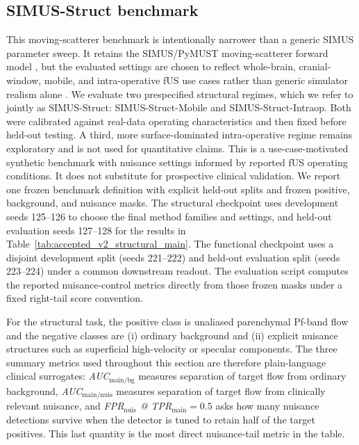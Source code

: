 \documentclass[11pt]{article}
\begin{document}
\subsection{SIMUS-Struct benchmark}
\label{sec:accepted-v2-main}
This moving-scatterer benchmark is intentionally narrower than a generic SIMUS parameter sweep. It retains the SIMUS/PyMUST moving-scatterer forward model \cite{GarciaSIMUSPartI2022,CigierSIMUSPartII2022}, but the evaluated settings are chosen to reflect whole-brain, cranial-window, mobile, and intra-operative fUS use cases rather than generic simulator realism alone \cite{UrbanWholeBrain2015,Deffieux2021,Soloukey2020FUSAwake,Rabut2024}. We evaluate two prespecified structural regimes, which we refer to jointly as SIMUS-Struct: SIMUS-Struct-Mobile and SIMUS-Struct-Intraop. Both were calibrated against real-data operating characteristics and then fixed before held-out testing. A third, more surface-dominated intra-operative regime remains exploratory and is not used for quantitative claims.
This is a use-case-motivated synthetic benchmark with nuisance settings informed by reported fUS operating conditions. It does not substitute for prospective clinical validation. We report one frozen benchmark definition with explicit held-out splits and frozen positive, background, and nuisance masks. The structural checkpoint uses development seeds 125--126 to choose the final method families and settings, and held-out evaluation seeds 127--128 for the results in Table~\ref{tab:accepted_v2_structural_main}. The functional checkpoint uses a disjoint development split (seeds 221--222) and held-out evaluation split (seeds 223--224) under a common downstream readout. The evaluation script computes the reported nuisance-control metrics directly from those frozen masks under a fixed right-tail score convention.

For the structural task, the positive class is unaliased parenchymal Pf-band flow and the negative classes are (i) ordinary background and (ii) explicit nuisance structures such as superficial high-velocity or specular components. The three summary metrics used throughout this section are therefore plain-language clinical surrogates: \emph{AUC$_{\mathrm{main/bg}}$} measures separation of target flow from ordinary background, \emph{AUC$_{\mathrm{main/nuis}}$} measures separation of target flow from clinically relevant nuisance, and \emph{FPR$_{\mathrm{nuis}}$ @ TPR$_{\mathrm{main}}=0.5$} asks how many nuisance detections survive when the detector is tuned to retain half of the target positives. This last quantity is the most direct nuisance-tail metric in the table.
\end{document}
